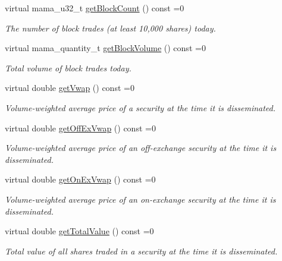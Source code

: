\begin{CompactItemize}
virtual mama\_\-u32\_\-t \hyperlink{classWombat_1_1MamdaTradeRecap_083bcc57e26be2e79bd391b8a2177e3f}{get\-Block\-Count} () const =0
\begin{CompactList}\small\item\em The number of block trades (at least 10,000 shares) today. \item\end{CompactList}\item 
virtual mama\_\-quantity\_\-t \hyperlink{classWombat_1_1MamdaTradeRecap_dc17d00de0594da995227b3f915d5fda}{get\-Block\-Volume} () const =0
\begin{CompactList}\small\item\em Total volume of block trades today. \item\end{CompactList}\item 
virtual double \hyperlink{classWombat_1_1MamdaTradeRecap_b80bace23fde9c5712351bc6a9f2344b}{get\-Vwap} () const =0
\begin{CompactList}\small\item\em Volume-weighted average price of a security at the time it is disseminated. \item\end{CompactList}\item 
virtual double \hyperlink{classWombat_1_1MamdaTradeRecap_9c9488d1b62675928ec13e2f8d9fdd53}{get\-Off\-Ex\-Vwap} () const =0
\begin{CompactList}\small\item\em Volume-weighted average price of an off-exchange security at the time it is disseminated. \item\end{CompactList}\item 
virtual double \hyperlink{classWombat_1_1MamdaTradeRecap_dd064f9710f59f8f07309dec3d11411a}{get\-On\-Ex\-Vwap} () const =0
\begin{CompactList}\small\item\em Volume-weighted average price of an on-exchange security at the time it is disseminated. \item\end{CompactList}\item 
virtual double \hyperlink{classWombat_1_1MamdaTradeRecap_5dd7f2055b4a80d111661c4a1da2abb9}{get\-Total\-Value} () const =0
\begin{CompactList}\small\item\em Total value of all shares traded in a security at the time it is disseminated. \item\end{CompactList}\item 

\end{CompactItemize}
